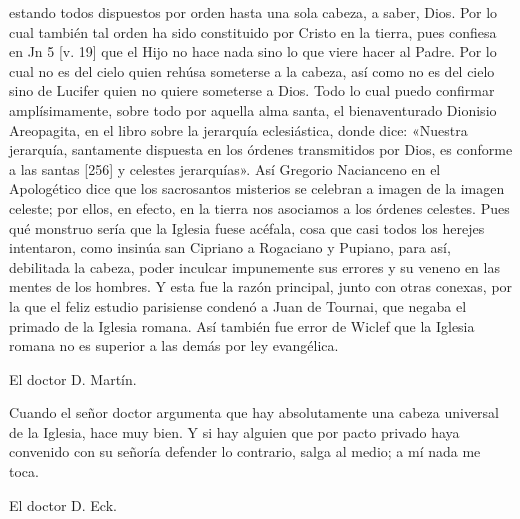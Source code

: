 estando todos dispuestos por orden hasta una sola cabeza, a saber, Dios. Por lo cual también tal orden ha sido constituido por Cristo en la tierra, pues confiesa en Jn 5 [v. 19] que el Hijo no hace nada sino lo que viere hacer al Padre. Por lo cual no es del cielo quien rehúsa someterse a la cabeza, así como no es del cielo sino de Lucifer quien no quiere someterse a Dios. Todo lo cual puedo confirmar amplísimamente, sobre todo por aquella alma santa, el bienaventurado Dionisio Areopagita, en el libro sobre la jerarquía eclesiástica, donde dice: «Nuestra jerarquía, santamente dispuesta en los órdenes transmitidos por Dios, es conforme a las santas [256] y celestes jerarquías». Así Gregorio Nacianceno en el Apologético dice que los sacrosantos misterios se celebran a imagen de la imagen celeste; por ellos, en efecto, en la tierra nos asociamos a los órdenes celestes. Pues qué monstruo sería que la Iglesia fuese acéfala, cosa que casi todos los herejes intentaron, como insinúa san Cipriano a Rogaciano y Pupiano, para así, debilitada la cabeza, poder inculcar impunemente sus errores y su veneno en las mentes de los hombres. Y esta fue la razón principal, junto con otras conexas, por la que el feliz estudio parisiense condenó a Juan de Tournai, que negaba el primado de la Iglesia romana. Así también fue error de Wiclef que la Iglesia romana no es superior a las demás por ley evangélica.

El doctor D. Martín.

Cuando el señor doctor argumenta que hay absolutamente una cabeza universal de la Iglesia, hace muy bien. Y si hay alguien que por pacto privado haya convenido con su señoría defender lo contrario, salga al medio; a mí nada me toca.

El doctor D. Eck.

